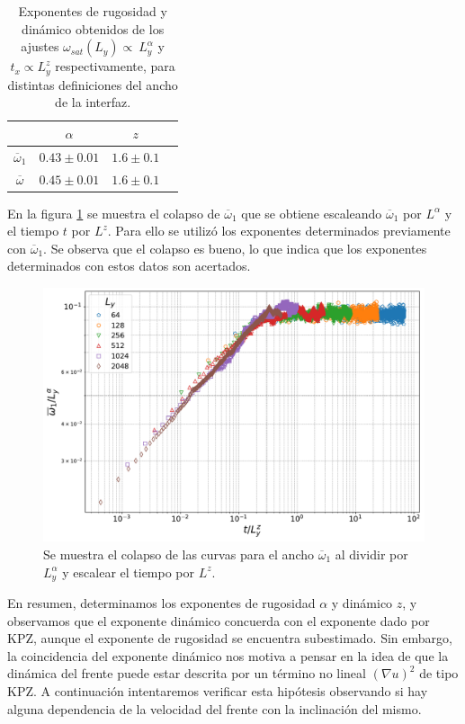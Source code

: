 \begin{table}[t]
    \centering
    \begin{tabular}{@{}cccc@{}}
    \toprule
     & $\alpha$     & $z$    \\ \midrule
    $\overline{\omega}_1$    & $0.43\pm0.01$ & $1.6 \pm 0.1$ \\
    $\overline{\omega}  $  & $0.45\pm0.01$ & $1.6 \pm 0.1$\\
    \end{tabular}
    \caption{Exponentes de rugosidad y dinámico obtenidos de los ajustes $\omega_{sat}(L_y) \propto~ L_y^{\alpha}$ y $t_x \propto L_y^z$ respectivamente, para distintas definiciones del ancho de la interfaz.}
    \label{tab:exponentes}
\end{table}

En la figura \ref{fig:colapse} se muestra el colapso de $\overline{\omega}_1$ que se obtiene escaleando $\overline{\omega}_1$ por $L^\alpha$ y el tiempo $t$ por $L^z$. Para ello se utilizó los exponentes determinados previamente con $\overline{\omega}_1$. Se observa que el colapso es bueno, lo que indica que los exponentes determinados con estos datos son acertados.

\begin{figure}[!b]
    \centering
    \includegraphics[width=\imsizeL]{colapse.pdf}
    \caption{Se muestra el colapso de las curvas para el ancho $\overline{\omega}_1$ al dividir por $L_y^{\alpha}$ y escalear el tiempo por $L^z$.}
    \label{fig:colapse}
\end{figure}

En resumen, determinamos los exponentes de rugosidad $\alpha$ y dinámico $z$, y observamos que el exponente dinámico concuerda con el exponente dado por KPZ, aunque el exponente de rugosidad se encuentra subestimado. Sin embargo, la coincidencia del exponente dinámico nos motiva a pensar en la idea de que la dinámica del frente puede estar descrita por un término no lineal $(\nabla u)^2$ de tipo KPZ. A continuación intentaremos verificar esta hipótesis observando si hay alguna dependencia de la velocidad del frente con la inclinación del mismo.


